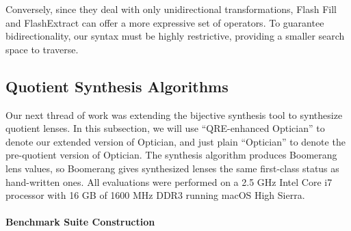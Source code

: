 \documentclass[12pt]{article}
\begin{document}
{Conversely, since they deal with only unidirectional transformations, Flash
Fill and FlashExtract can offer a more expressive set of operators.  To
guarantee bidirectionality, our syntax must be highly restrictive, providing
a smaller search space to traverse.

\subsection{Quotient Synthesis Algorithms}


\newcommand{\wf}[1]{\ensuremath{#1\;\mathsf{wf}}}

\newcommand{\re}[1]{\ensuremath{\mathtt{#1}}}
\newcommand{\codefont}[1]{\ensuremath{\mathsf{#1}}}
\newcommand{\kw}[1]{\textcolor{dkblue}{\ensuremath{\mathsf{#1}}}}
\newcommand{\collapse}[2]{\ensuremath{\kw{collapse} \; #1 \mapsto #2}}
\newcommand{\squash}[3]{\ensuremath{\kw{squash} \; #1 \rightarrow #2\; \kw{using} \; #3}}
\newcommand{\perm}[2]{\ensuremath{\kw{perm}(#1)\; \kw{with}\; #2}}
\newcommand{\normalize}[3]{\ensuremath{\kw{normalize}(#1, #2, #3)}}
\newcommand{\eqrel}[1]{\ensuremath{\equiv_{#1}}}

\newcommand{\canonize}{\ensuremath{\kw{canonize}}}

\newcommand{\Name}{Optometrist\xspace}

\newcommand{\QRESize}{\textbf{QS}}
\newcommand{\canonizeAndSpecSize}{\textbf{BS}}
\newcommand{\LensAndSpecSize}{\textbf{NS}}

\newcommand{\QOpt}{QRE-enhanced Optician}
\newcommand{\OpticianRuntime}{\textbf{Optician}}
\newcommand{\QREOptician}{\textbf{Optician\textsubscript{Q}}}
\newcommand{\SystemOnOptician}{\textbf{QO}}
\newcommand{\SystemOnBenchmarks}{\textbf{QQ}}
\newcommand{\cd}[1]{\lstinline[backgroundcolor=\color{white}]$#1$}

Our next thread of work was extending the bijective synthesis tool to
synthesize quotient lenses. In this subsection, we will use ``\QOpt'' to
denote our extended version of Optician, and just plain ``Optician'' to
denote the pre-quotient version of Optician. The synthesis algorithm
produces Boomerang lens values, so Boomerang gives synthesized lenses the
same first-class status as hand-written ones.
%
All evaluations were performed on a 2.5 GHz Intel Core i7 processor with 16 GB
of 1600 MHz DDR3 running macOS High Sierra.


\paragraph*{Benchmark Suite Construction}

}
\end{document}
